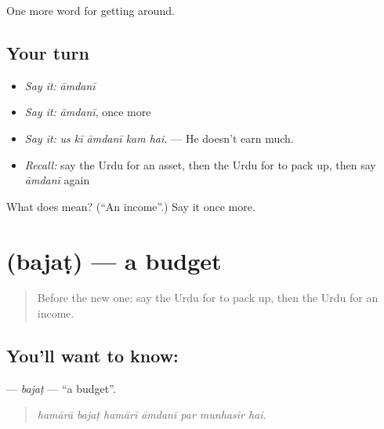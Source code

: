 \begin{grammarlens}[title={What you've built}]
One more word for getting around.
\end{grammarlens}

\subsection*{Your turn}
\begin{itemize}
\raggedright
  \item \emph{Say it:} \emph{āmdanī}
  \item \emph{Say it:} \emph{āmdanī}, once more
  \item \emph{Say it:} \emph{us kī āmdanī kam hai.} — He doesn't earn much.
  \item \emph{Recall:} say the Urdu for an asset, then the Urdu for to pack up, then say \emph{āmdanī} again
\end{itemize}

\begin{tcolorbox}[breakable,colback=teal!4,colframe=teal!35!black,title={Before you move on}]
What does  mean? (\textquotedblleft{}An income\textquotedblright{}.) Say it once more.
\end{tcolorbox}
\section[\texorpdfstring{\ur{بجٹ} (bajaṭ)}{بجٹ (bajaṭ)}]{ (bajaṭ) — a budget}

\label{lesson:UR-C420-bajat}



\begin{quote}
Before the new one: say the Urdu for to pack up, then the Urdu for an income.
\end{quote}

\subsection*{You'll want to know: }
\textbf{} — \emph{bajaṭ} — \textquotedblleft{}a budget\textquotedblright{}.

\begin{quote}
      
\end{quote}

\begin{quote}
\emph{hamārā bajaṭ hamārī āmdanī par munhasir hai.}
\end{quote}

